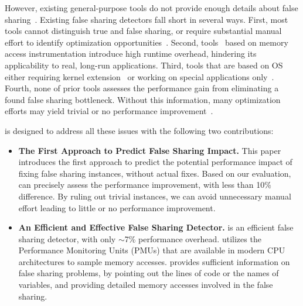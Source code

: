 However, existing general-purpose tools do not provide enough details about false sharing~\cite{gprof, ibs-sc, Intel:VTune}. Existing false sharing detectors fall short in several ways. First, most tools cannot distinguish true and false sharing, or require substantial manual effort to identify optimization opportunities~\cite{falseshare:binaryinstrumentation1,detect:ptu,detect:intel,falseshare:binaryinstrumentation2,DProf, qinzhao, OSdetection, mldetect, Wicaksono11detectingfalse, openmp}. Second, tools~\cite{falseshare:binaryinstrumentation1,falseshare:binaryinstrumentation2,falseshare:simulator, Predator} based on memory access instrumentation introduce high runtime overhead, hindering its applicability to real, long-run applications. Third, tools that are based on OS either requiring kernel extension~\cite{OSdetection} or working on special applications only~\cite{Sheriff}. Fourth, none of prior tools assesses the performance gain from eliminating a found false sharing bottleneck. Without this information, many optimization efforts may yield trivial or no performance improvement~\cite{Sheriff, qinzhao}.

\Cheetah{} is designed to address all these issues with the following two contributions:
\begin{itemize} 

\item {\bf The First Approach to Predict False Sharing Impact.} This paper introduces the first approach to predict the potential performance impact of fixing false sharing instances, without actual fixes. Based on our evaluation, \cheetah{} can precisely assess the performance improvement, with less than 10\% difference. By ruling out trivial instances, we can avoid unnecessary manual effort leading to little or no performance improvement. 

\item {\bf An Efficient and Effective False Sharing Detector.} \cheetah{} is an efficient false sharing detector, with only $\sim$7\% performance overhead. \Cheetah{} utilizes the Performance Monitoring Units (PMUs) that are available in modern CPU architectures to sample memory accesses. \cheetah{} provides sufficient information on false sharing problems, by pointing out the lines of code or the names of variables, and providing detailed memory accesses involved in the false sharing. %
\end{itemize}

